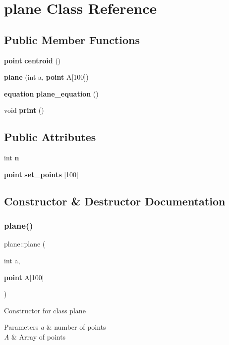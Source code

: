 \section{plane Class Reference}
\label{classplane}
\subsection*{Public Member Functions}
\begin{DoxyCompactItemize}
\item 
\textbf{ point} \textbf{ centroid} ()
\item 
\textbf{ plane} (int a, \textbf{ point} A[100])
\item 
\textbf{ equation} \textbf{ plane\+\_\+equation} ()
\item 
void \textbf{ print} ()
\end{DoxyCompactItemize}
\subsection*{Public Attributes}
\begin{DoxyCompactItemize}
\item 
int \textbf{ n}
\item 
\textbf{ point} \textbf{ set\+\_\+points} [100]
\end{DoxyCompactItemize}


\subsection{Constructor \& Destructor Documentation}
\mbox{\label{classplane_a9697ea6ff74b3e3c13d64d89e9fcc1fd}} 
\subsubsection{plane()}
{\footnotesize\ttfamily plane\+::plane (\begin{DoxyParamCaption}\item[{int}]{a,  }\item[{\textbf{ point}}]{A[100] }\end{DoxyParamCaption})\hspace{0.3cm}{\ttfamily [inline]}}

Constructor for class plane 
\begin{DoxyParams}{Parameters}
{\em a} & number of points \\
\hline
{\em A} & Array of points \\
\hline
\end{DoxyParams}


